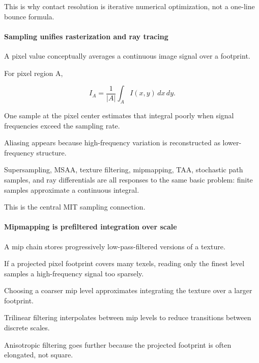This is why contact resolution is iterative numerical optimization, not a one-line bounce formula.

\paragraph{Sampling unifies rasterization and ray tracing}\label{03-visual-computing-i-ch001-sampling-unifies-rasterization-and-ray-tracing}

\hypertarget{03-visual-computing-i-ch001-sampling-unifies-rasterization-and-ray-tracing}{}

A pixel value conceptually averages a continuous image signal over a footprint.

For pixel region A,

\[
I_A
=
\frac{1}{|A|}
\int_A I(x,y)\,dx\,dy.
\]

One sample at the pixel center estimates that integral poorly when signal frequencies exceed the sampling rate.

Aliasing appears because high-frequency variation is reconstructed as lower-frequency structure.

Supersampling, MSAA, texture filtering, mipmapping, TAA, stochastic path samples, and ray differentials are all responses to the same basic problem: finite samples approximate a continuous integral.

This is the central MIT sampling connection.

\paragraph{Mipmapping is prefiltered integration over scale}\label{03-visual-computing-i-ch001-mipmapping-is-prefiltered-integration-over-scale}

\hypertarget{03-visual-computing-i-ch001-mipmapping-is-prefiltered-integration-over-scale}{}

A mip chain stores progressively low-pass-filtered versions of a texture.

If a projected pixel footprint covers many texels, reading only the finest level samples a high-frequency signal too sparsely.

Choosing a coarser mip level approximates integrating the texture over a larger footprint.

Trilinear filtering interpolates between mip levels to reduce transitions between discrete scales.

Anisotropic filtering goes further because the projected footprint is often elongated, not square.

